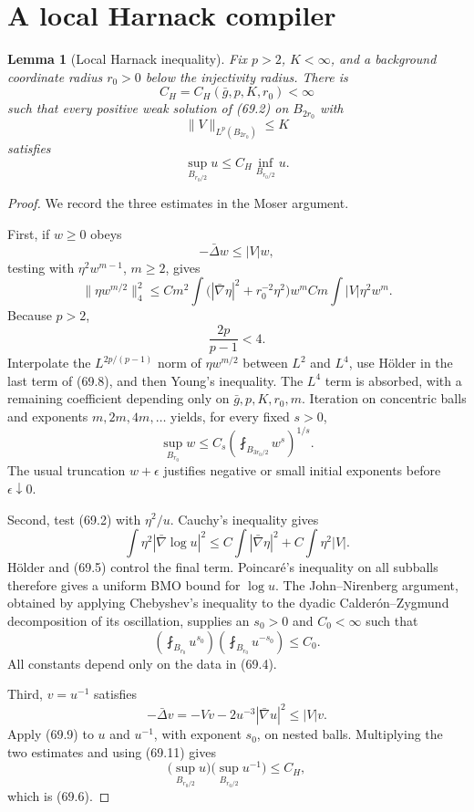 \documentclass[11pt]{article}
\newtheorem{lemma}[theorem]{Lemma}
\theoremstyle{remark}
\begin{document}
\section{A local Harnack compiler}

\begin{lemma}[Local Harnack inequality]
\label{lem:v15v69-local-harnack}
Fix \(p>2\), \(K<\infty\), and a background coordinate radius
\(r_0>0\) below the injectivity radius.  There is
\[
 C_H=C_H(\bar g,p,K,r_0)<\infty                       \tag{69.4}
\]
such that every positive weak solution of (69.2) on \(B_{2r_0}\)
with
\[
 \|V\|_{L^p(B_{2r_0})}\leq K                          \tag{69.5}
\]
satisfies
\[
 \sup_{B_{r_0/2}}u
 \leq C_H\inf_{B_{r_0/2}}u.                           \tag{69.6}
\]
\end{lemma}

\begin{proof}
We record the three estimates in the Moser argument.

First, if \(w\geq0\) obeys
\[
 -\bar\Delta w\leq |V|w,                              \tag{69.7}
\]
testing with \(\eta^2w^{m-1}\), \(m\geq2\), gives
\[
 \|\eta w^{m/2}\|_4^2
 \leq
 C m^2\int
 \bigl(|\bar\nabla\eta|^2+r_0^{-2}\eta^2\bigr)w^m
 C m\int |V|\eta^2w^m.                                \tag{69.8}
\]
Because \(p>2\),
\[
 \frac{2p}{p-1}<4.
\]
Interpolate the \(L^{2p/(p-1)}\) norm of
\(\eta w^{m/2}\) between \(L^2\) and \(L^4\), use
H\"older in the last term of (69.8), and then Young's inequality.
The \(L^4\) term is absorbed, with a remaining coefficient
depending only on \(\bar g,p,K,r_0,m\).  Iteration on concentric
balls and exponents \(m,2m,4m,\ldots\) yields, for every fixed
\(s>0\),
\[
 \sup_{B_{r_0}}w
 \leq
 C_s\left(\fint_{B_{3r_0/2}}w^s\right)^{1/s}.          \tag{69.9}
\]
The usual truncation \(w+\epsilon\) justifies negative or small
initial exponents before \(\epsilon\downarrow0\).

Second, test (69.2) with \(\eta^2/u\).  Cauchy's inequality gives
\[
 \int\eta^2|\bar\nabla\log u|^2
 \leq
 C\int|\bar\nabla\eta|^2+
 C\int\eta^2|V|.                                      \tag{69.10}
\]
H\"older and (69.5) control the final term.  Poincar\'e's
inequality on all subballs therefore gives a uniform BMO bound for
\(\log u\).  The John--Nirenberg argument, obtained by applying
Chebyshev's inequality to the dyadic Calder\'on--Zygmund
decomposition of its oscillation, supplies an \(s_0>0\) and
\(C_0<\infty\) such that
\[
 \left(\fint_{B_{r_0}}u^{s_0}\right)
 \left(\fint_{B_{r_0}}u^{-s_0}\right)\leq C_0.         \tag{69.11}
\]
All constants depend only on the data in (69.4).

Third, \(v=u^{-1}\) satisfies
\[
 -\bar\Delta v
 =
 -Vv-2u^{-3}|\bar\nabla u|^2
 \leq |V|v.                                           \tag{69.12}
\]
Apply (69.9) to \(u\) and \(u^{-1}\), with exponent \(s_0\), on
nested balls.  Multiplying the two estimates and using (69.11)
gives
\[
 \bigl(\sup_{B_{r_0/2}}u\bigr)
 \bigl(\sup_{B_{r_0/2}}u^{-1}\bigr)\leq C_H,
\]
which is (69.6).
\end{proof}
\end{document}

